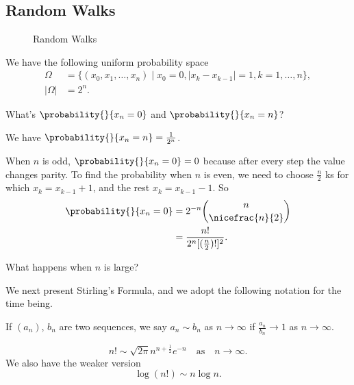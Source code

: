 \subsection{Random Walks}
\begin{figure}[htpb]
    \begin{subfigure}{0.48\textwidth}
    \centering
    \end{subfigure}
    \begin{subfigure}{0.48\textwidth}
    \centering
    \end{subfigure}
    \caption{Random Walks}
    \label{fig:}
\end{figure}
We have the following uniform probability space
\begin{align*}
    \Omega &= \{(x_0, x_1, \ldots ,x_n) \mid x_0 = 0, \left\vert x_k - x_{k-1} \right\vert = 1, k = 1, \ldots, n\},\\
    \left\vert \Omega \right\vert &= 2^n.
\end{align*}
\begin{problem}
    What's \(\probability{}{x_n = 0}\) and \(\probability{}{x_n = n} \)?
\end{problem}
We have \(\probability{}{x_n = n} = \frac{1}{2^n}\).

When \(n\) is odd, \(\probability{}{x_n = 0} = 0\) because after every step the value changes parity. To find the probability when \(n\) is even, we need to choose \(\frac{n}{2}\) ks for which \(x_k = x_{k-1} + 1\), and the rest \(x_k = x_{k-1}-1\). So
\begin{align*}
    \probability{}{x_n=0} &= 2^{-n}\binom{n}{\nicefrac{n}{2}}\\
    &= \frac{n!}{2^n[(\frac{n}{2})!]^2}.
\end{align*}
\begin{problem}
    What happens when \(n\) is large?
\end{problem}
We next present Stirling's Formula, and we adopt the following notation for the time being.
\begin{notation}
    If \((a_n)\), \(b_n\) are two sequences, we say \(a_{n} \sim b_n \) as \(n \to \infty\) if \(\frac{a_n}{b_n}\to 1\) as \(n \to \infty\).
\end{notation}
\begin{theorem}
    \leavevmode
    \[
        n! \sim \sqrt{2\pi} n^{n+\frac{1}{2}}e^{-n} \quad \text{as}\quad n \to \infty.
    \]
    We also have the weaker version
    \[
        \log(n!)\sim n\log n.
    \]
\end{theorem}